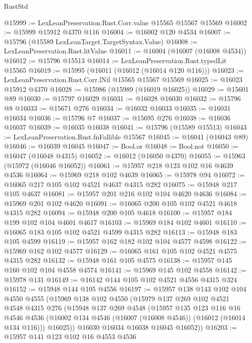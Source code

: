 \begin{lexlean}{RustStd}
\begin{coremodule}
@15999 := LexLeanPreservation.Rust.Corr.value @15565 @15567 @15569
@16002 := @15999 @15912 @4370 @116
@16004 := @16002 @120 @4534
@16007 := @15796 (@15589 LexLeanTarget.TargetSyntax.Value)
@16008 := LexLeanPreservation.Rust.litValue
@16011 := @16004 (@16007 (@16008 @4534))
@16012 := @15796 @15513
@16014 := LexLeanPreservation.Rust.typedLit @15565
@16019 := @15995 (@16011 (@16012 (@16014 @120 @116)))
@16023 := LexLeanPreservation.Rust.Corr.lNil @15565 @15567 @15569
@16025 := @16023 @15912 @4370
@16028 := @15986 (@15989 (@16019 @16025))
@16029 := @15601 @89
@16030 := @15797 @16029
@16031 := @16028 @16030
@16032 := @15796 @8
@16033 := @15671 @276
@16034 := @16032 @16033
@16035 := @16031 @16034
@16036 := @15796 @7
@16037 := @15695 @276
@16038 := @16036 @16037
@16039 := @16035 @16038
@16041 := @15796 (@15589 @15513)
@16043 := LexLeanPreservation.Rust.fnFallible @15567
@16045 := @16041 (@16043 @89)
@16046 := @16039 @16045
@16047 := Bool.or
@16048 := Bool.not
@16050 := @16047 (@16048 @4315)
@16052 := @16012 (@16050 @4370)
@16055 := @15963 (@15972 (@16046 @16052))
@16061 := @15957 @218 @123 @102 @16 @4639 @4536
@16064 := @15969 @218 @102 @4639
@16065 := @15978 @94
@16072 := @16065 @217 @105 @102 @4521 @4637 @4315 @282
@16075 := @15948 @217 @105 @4637
@16081 := @15957 @201 @216 @102 @104 @4620 @4636
@16084 := @15969 @201 @102 @4620
@16091 := @16065 @200 @105 @102 @4521 @4618 @4315 @282
@16094 := @15948 @200 @105 @4618
@16100 := @15957 @184 @199 @102 @104 @4601 @4617
@16103 := @15969 @184 @102 @4601
@16110 := @16065 @183 @105 @102 @4521 @4599 @4315 @282
@16113 := @15948 @183 @105 @4599
@16119 := @15957 @162 @182 @102 @104 @4577 @4598
@16122 := @15969 @162 @102 @4577
@16129 := @16065 @161 @105 @102 @4521 @4575 @4315 @282
@16132 := @15948 @161 @105 @4575
@16138 := @15957 @145 @160 @102 @104 @4558 @4574
@16141 := @15969 @145 @102 @4558
@16142 := @15978 @131
@16149 := @16142 @144 @105 @102 @4521 @4556 @4315 @324
@16152 := @15948 @144 @105 @4556
@16197 := @15957
    @138
    @143
    @102
    @104
    @4550
    @4555
    (@15969
      @138
      @102
      @4550
      (@15979
        @137
        @269
        @102
        @4521
        @4548
        @4315
        @276
        (@15948
          @137
          @269
          @4548
          (@15957
            @135
            @123
            @116
            @16
            @4546
            @4536
            (@16002 @134 @4546 (@16007 (@16008 @4546)) (@16012 (@16014 @134 @116)))
            @16025))
        @16030
        @16034
        @16038
        @16045
        @16052))
@16203 := @15957 @141 @123 @102 @16 @4553 @4536

\end{coremodule}
\end{lexlean}
